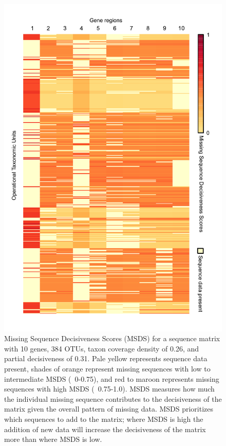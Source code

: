 \documentclass[10pt]{report}
\begin{document}
\begin{figure}[!tpb]
\centerline{\includegraphics[scale=1.0]{figures/MSDS_figure_1.pdf}}
\caption{Missing Sequence Decisiveness Scores (MSDS) for a sequence matrix with 10 genes, 384 OTUs, taxon coverage density of 0.26, and partial decisiveness of 0.31.
Pale yellow represents sequence data present, shades of orange represent missing sequences with low to intermediate MSDS (~0-0.75),
and red to maroon represents missing sequences with high MSDS (~0.75-1.0).
MSDS measures how much the individual missing sequence contributes to the decisiveness of the matrix given the overall pattern of missing data.
MSDS prioritizes which sequences to add to the matrix; where MSDS is high the addition of new data will increase the
decisiveness of the matrix more than where MSDS is low.}\label{fig:02}
\end{figure}


%


\end{document}

